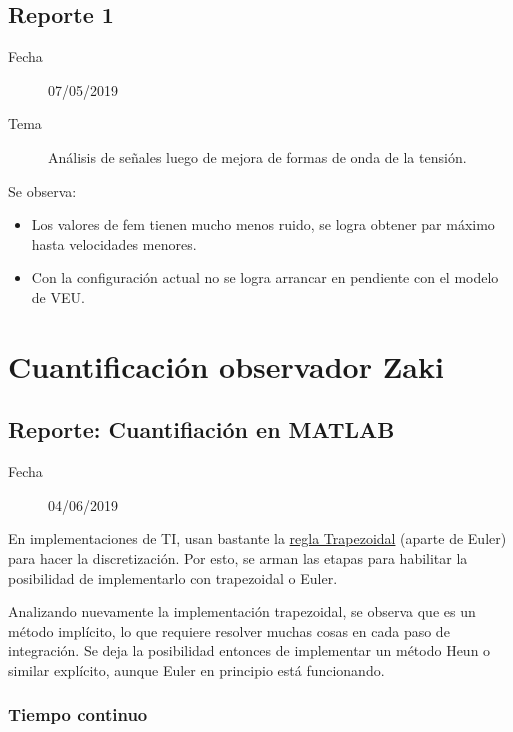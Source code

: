 \documentclass{article}
\begin{document}
		
		\subsection{Reporte 1}
		\begin{description}
			\item[Fecha]  07/05/2019 
			\item[Tema] Análisis de señales luego de mejora de formas de onda de la tensión.
		\end{description}
		
		Se observa:
		\begin{itemize}
			\item Los valores de fem tienen mucho menos ruido, se logra obtener par máximo hasta velocidades menores.
			\item Con la configuración actual no se logra arrancar en pendiente con el modelo de VEU.
		\end{itemize}
		
	\section{Cuantificación observador Zaki}
		
        
        \subsection{Reporte: Cuantifiación en MATLAB}
        \begin{description}
        	\item[Fecha]  04/06/2019 
        \end{description}
		
        En implementaciones de TI, usan bastante la
        \href{https://en.wikipedia.org/wiki/Trapezoidal_rule_(differential_equations)}{regla Trapezoidal} (aparte de Euler) para hacer la discretización. Por esto, se arman las etapas para habilitar la posibilidad de implementarlo con trapezoidal o Euler.

        Analizando nuevamente la implementación trapezoidal, se observa que es un método implícito, lo que requiere resolver muchas cosas en cada paso de integración. Se deja la posibilidad entonces de implementar un método Heun o similar explícito, aunque Euler en principio está funcionando.
        
        \subsubsection{Tiempo continuo}
\end{document}
